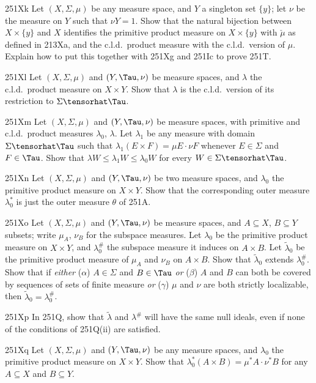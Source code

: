 {\sqheader 251Xk Let $(X,\Sigma,\mu)$ be any measure space, and
$Y$ a singleton
set $\{y\}$;  let $\nu$ be the measure on $Y$ such that $\nu Y=1$.
Show that the natural bijection between $X\times\{y\}$ and $X$
identifies the primitive product measure on $X\times\{y\}$ with
$\check\mu$ as defined in 213Xa, and the c.l.d.\ product measure with
the c.l.d.\
version of $\mu$.   Explain how to put this together with 251Xg and
251Ic to prove 251T.

\sqheader 251Xl Let $(X,\Sigma,\mu)$ and $(Y,\Tau,\nu)$ be measure
spaces, and $\lambda$ the c.l.d.\ product measure on $X\times Y$.   Show
that $\lambda$ is the c.l.d.\ version of its restriction to
$\Sigma\tensorhat\Tau$.

\spheader 251Xm Let $(X,\Sigma,\mu)$ and $(Y,\Tau,\nu)$ be measure
spaces, with primitive and c.l.d.\ product measures $\lambda_0$,
$\lambda$.   Let
$\lambda_1$ be any measure with domain $\Sigma\tensorhat\Tau$ such that
$\lambda_1(E\times F)=\mu E\cdot\nu F$ whenever $E\in\Sigma$ and
$F\in\Tau$.   Show that $\lambda W\le\lambda_1W\le\lambda_0W$ for every
$W\in\Sigma\tensorhat\Tau$.

\spheader 251Xn Let $(X,\Sigma,\mu)$ and $(Y,\Tau,\nu)$ be two measure
spaces, and $\lambda_0$ the primitive product measure on $X\times Y$.
Show that the corresponding outer measure $\lambda_0^*$ is just the
outer measure $\theta$ of 251A.

\spheader 251Xo Let $(X,\Sigma,\mu)$ and $(Y,\Tau,\nu)$
be measure spaces, and $A\subseteq X$, $B\subseteq
Y$ subsets;  write $\mu_A$, $\nu_B$ for the subspace
measures.   Let $\lambda_0$ be the primitive
product measure on $X\times Y$, and $\lambda_0^{\#}$
the subspace measure it induces on $A\times B$.   Let $\tilde\lambda_0$
be the primitive product measure of
$\mu_A$ and $\nu_B$ on $A\times B$.   Show that $\tilde\lambda_0$
extends $\lambda_0^{\#}$.
Show that if
{\it either} ($\alpha$) $A\in\Sigma$ and $B\in\Tau$
{\it or} ($\beta$) $A$ and $B$ can both be covered by sequences of sets
of finite measure
{\it or} ($\gamma$) $\mu$ and $\nu$ are both strictly localizable,
then $\tilde\lambda_0=\lambda_0^{\#}$.

\spheader 251Xp In 251Q, show that $\tilde\lambda$ and $\lambda^{\#}$
will have the same null ideals, even if none of the conditions of
251Q(ii) are satisfied.

\spheader 251Xq Let $(X,\Sigma,\mu)$ and $(Y,\Tau,\nu)$ be any measure
spaces, and $\lambda_0$ the primitive product measure on $X\times Y$.
Show that $\lambda_0^*(A\times B)=\mu^*A\cdot\nu^*B$ for any
$A\subseteq X$ and $B\subseteq Y$.

}
